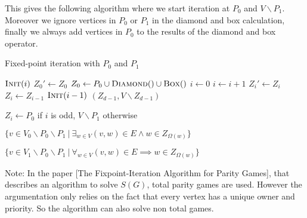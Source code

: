 \documentclass[]{article}
\begin{document}
	This gives the following algorithm where we start iteration at $P_0$ and $V\backslash P_1$. Moreover we ignore vertices in $P_0$ or $P_1$ in the diamond and box calculation, finally we always add vertices in $P_0$ to the results of the diamond and box operator.
	
	\begin{algorithm}
		\caption{Fixed-point iteration with $P_0$ and $P_1$}
		\label{alg_FPITE}
		\begin{multicols}{2}
			\begin{algorithmic}[1]
				\State $\textsc{Init}(i)$
				\EndFor
				\Repeat
				\State $Z_0'\gets Z_0$
				\State $Z_0 \gets P_0 \cup \textsc{Diamond}() \cup \textsc{Box}()$
				\State $i \gets 0$
				\State $i \gets i+1$
				\State $Z_i' \gets Z_i$
				\State $Z_i \gets Z_{i-1}$
				\State $\textsc{Init}(i-1)$
				\EndWhile
				\State \Return $(Z_{d-1},V\backslash Z_{d-1})$
				\EndFunction
			\end{algorithmic}\bigskip\bigskip
			\begin{algorithmic}[1]
				\Function{Init}{$i$}
				\State $Z_i \gets P_0$ if $i$ is odd, $V\backslash P_1$ otherwise
				\EndFunction
			\end{algorithmic}\bigskip
			\begin{algorithmic}[1]
				\Function{Diamond}{}
				\State \Return $\{ v \in V_0\backslash P_0 \backslash P_1\ |\ \exists_{w\in V} (v,w) \in E \wedge w \in Z_{\Omega(w)}\}$
				\EndFunction
			\end{algorithmic}\bigskip
			\begin{algorithmic}[1]
				\Function{Box}{}
				\State \Return $\{ v \in V_1\backslash P_0 \backslash P_1\ |\ \forall_{w\in V} (v,w) \in E \implies w \in Z_{\Omega(w)}\}$
				\EndFunction
			\end{algorithmic}
		\end{multicols}
	\end{algorithm}

Note: In the paper [The Fixpoint-Iteration Algorithm for Parity Games], that describes an algorithm to solve $S(G)$, total parity games are used. However the argumentation only relies on the fact that every vertex has a unique owner and priority. So the algorithm can also solve non total games.
\end{document}
